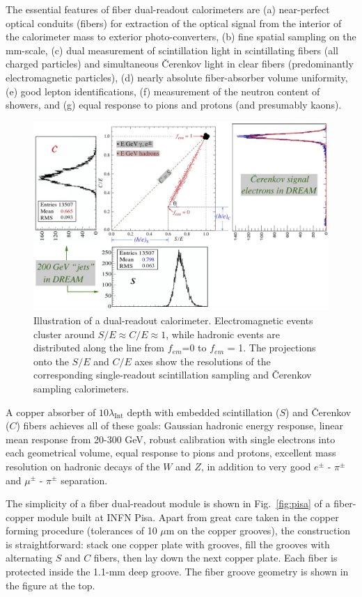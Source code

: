 The essential features of  fiber dual-readout calorimeters are (a) near-perfect optical conduits (fib\-ers)
for extraction of the optical signal from the interior of the calorimeter mass to exterior photo-convert\-ers, 
(b) fine spatial sampling on the mm-scale, (c) dual measurement of scintillation light in scintillating
fibers (all charged particles) and simultaneous \v{C}er\-enk\-ov light in clear fibers (predominantly electromagnetic
particles), (d) nearly absolute fiber-absorber volume uniformity, (e) good lepton identifications, (f) measurement of the neutron content of showers, and (g) equal response to pions and protons (and presumably kaons).
 
 
\begin{figure}
 \centering
 \includegraphics[width=.7\linewidth]{Calorimeter/DualReadout/groom-plot-projs.jpg}
  \caption{Illustration of a dual-readout calorimeter.  Electromagnetic events cluster around $S/E\approx C/E \approx 1$,
  while hadronic events are distributed along the line from $f_{em}$=0 to $f_{em}$ = 1.  The projections onto the $S/E$ and $C/E$
  axes show the resolutions of the corresponding single-readout scintillation sampling and \v{C}er\-enk\-ov sampling calorimeters.}  
  \label{fig:groom}
\end{figure}

 A copper absorber of $10 \lambda_{\text{Int}}$ depth with embedded scintillation ($S$) and \v{C}er\-enk\-ov ($C$) fibers achieves
 all of these goals:  Gaussian hadronic energy response,  linear mean response from 20-300 GeV, 
  robust calibration with single electrons into each geometrical volume, 
  equal response to pions and protons, 
  excellent mass resolution on hadronic decays of the $W$ and $Z$,
  in addition to very good $e^{\pm}$ -  $\pi^{\pm}$  and  $\mu^{\pm}$ -  $\pi^{\pm}$ separation.  
  
The simplicity of a fiber dual-readout module is shown in Fig.~\ref{fig:pisa} of a fiber-copper module built at INFN Pisa.  
Apart from great care taken in the copper forming procedure (tolerances of 10 $\mu$m on the copper grooves), the 
construction is straightforward: stack one copper plate with grooves, fill the grooves with alternating $S$ and $C$ fibers,
then lay down the next copper plate. Each fiber is protected inside the 1.1-mm deep groove. The fiber groove geometry
is shown in the figure at the top.   
 
